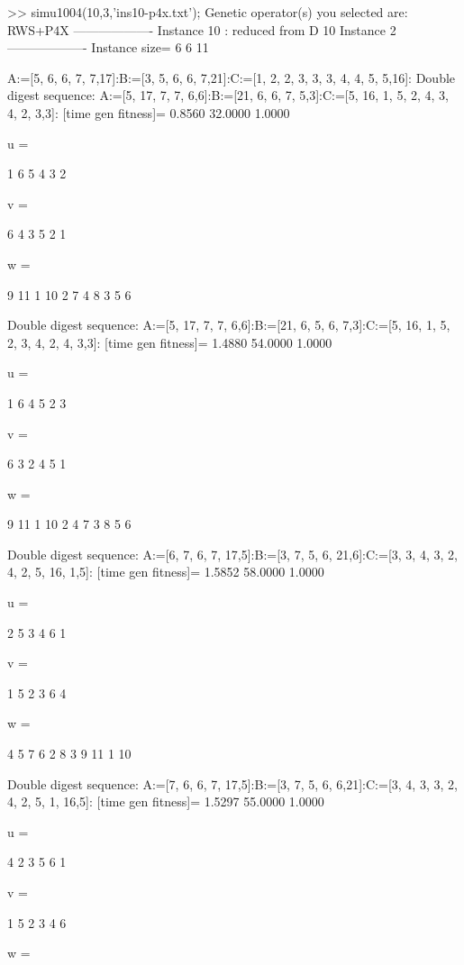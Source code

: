 >> simu1004(10,3,'ins10-p4x.txt');
Genetic operator(s) you selected are:
RWS+P4X
------------------- Instance 10 : reduced from D 10 Instance 2 -------------------
Instance size=
     6     6    11

A:=[5, 6, 6, 7, 7,17]:B:=[3, 5, 6, 6, 7,21]:C:=[1, 2, 2, 3, 3, 3, 4, 4, 5, 5,16]:
Double digest sequence:
A:=[5, 17, 7, 7, 6,6]:B:=[21, 6, 6, 7, 5,3]:C:=[5, 16, 1, 5, 2, 4, 3, 4, 2, 3,3]:
[time gen fitness]=
    0.8560   32.0000    1.0000


u =

     1     6     5     4     3     2


v =

     6     4     3     5     2     1


w =

     9    11     1    10     2     7     4     8     3     5     6

Double digest sequence:
A:=[5, 17, 7, 7, 6,6]:B:=[21, 6, 5, 6, 7,3]:C:=[5, 16, 1, 5, 2, 3, 4, 2, 4, 3,3]:
[time gen fitness]=
    1.4880   54.0000    1.0000


u =

     1     6     4     5     2     3


v =

     6     3     2     4     5     1


w =

     9    11     1    10     2     4     7     3     8     5     6

Double digest sequence:
A:=[6, 7, 6, 7, 17,5]:B:=[3, 7, 5, 6, 21,6]:C:=[3, 3, 4, 3, 2, 4, 2, 5, 16, 1,5]:
[time gen fitness]=
    1.5852   58.0000    1.0000


u =

     2     5     3     4     6     1


v =

     1     5     2     3     6     4


w =

     4     5     7     6     2     8     3     9    11     1    10

Double digest sequence:
A:=[7, 6, 6, 7, 17,5]:B:=[3, 7, 5, 6, 6,21]:C:=[3, 4, 3, 3, 2, 4, 2, 5, 1, 16,5]:
[time gen fitness]=
    1.5297   55.0000    1.0000


u =

     4     2     3     5     6     1


v =

     1     5     2     3     4     6


w =

